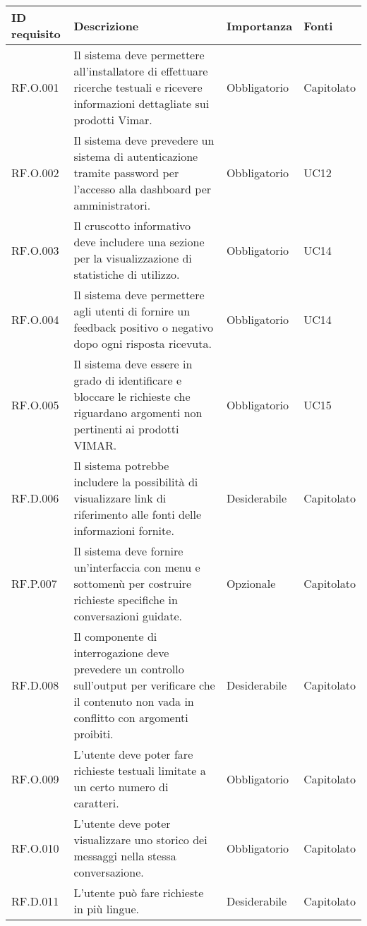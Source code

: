 

\begin{longtable}{|C{2.7cm}|L{7.2cm}|C{2.7cm}|C{2cm}|}
        \hline
        \textbf{ID requisito} & \textbf{Descrizione} & \textbf{Importanza} & \textbf{Fonti}  \\
        \hline
        RF.O.001 & Il sistema deve permettere all'installatore di effettuare ricerche testuali e ricevere informazioni dettagliate sui prodotti Vimar. & Obbligatorio & Capitolato \\
        \hline
        RF.O.002 & Il sistema deve prevedere un sistema di autenticazione tramite password per l'accesso alla dashboard per amministratori. & Obbligatorio & UC12 \\
        \hline
        RF.O.003 & Il cruscotto informativo deve includere una sezione per la visualizzazione di statistiche di utilizzo. & Obbligatorio & UC14 \\
        \hline
        RF.O.004 & Il sistema deve permettere agli utenti di fornire un feedback positivo o negativo dopo ogni risposta ricevuta. & Obbligatorio & UC14 \\
        \hline
        RF.O.005 & Il sistema deve essere in grado di identificare e bloccare le richieste che riguardano argomenti non pertinenti ai prodotti VIMAR. & Obbligatorio & UC15 \\
        \hline
        RF.D.006 & Il sistema potrebbe includere la possibilità di visualizzare link di riferimento alle fonti delle informazioni fornite. & Desiderabile & Capitolato \\
        \hline
        RF.P.007 & Il sistema deve fornire un'interfaccia con menu e sottomenù per costruire richieste specifiche in conversazioni guidate. & Opzionale & Capitolato\\
        \hline
        RF.D.008 & Il componente di interrogazione deve prevedere un controllo sull’output
        per verificare che il contenuto non vada in conflitto con argomenti proibiti. & Desiderabile & Capitolato \\
        \hline
        RF.O.009 & L’utente deve poter fare richieste testuali limitate a un certo numero di caratteri. & Obbligatorio & Capitolato \\
        \hline
        RF.O.010 & L’utente deve poter visualizzare uno storico dei messaggi nella stessa
        conversazione. & Obbligatorio & Capitolato \\
        \hline
        RF.D.011 & L’utente può fare richieste in più lingue.
         & Desiderabile & Capitolato \\

\end{longtable}
